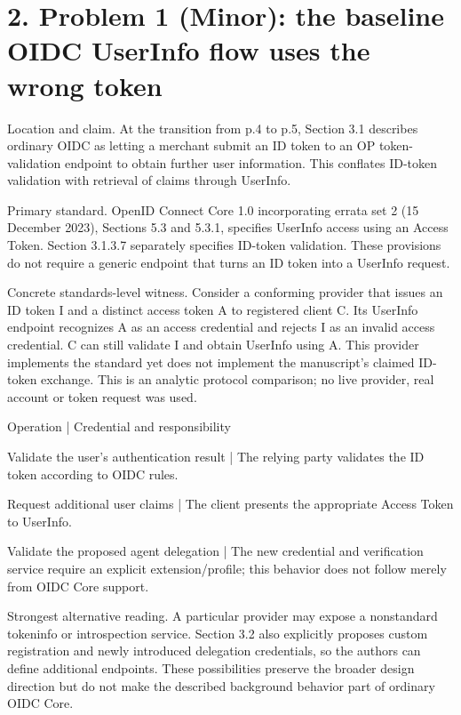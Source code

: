 \documentclass[10pt]{article}
\begin{document}
\section*{2. Problem 1 (Minor): the baseline OIDC UserInfo flow uses the wrong token}
Location and claim. At the transition from p.4 to p.5, Section 3.1 describes ordinary OIDC as letting a merchant submit an ID token to an OP token-validation endpoint to obtain further user information. This conflates ID-token validation with retrieval of claims through UserInfo.\par
Primary standard. OpenID Connect Core 1.0 incorporating errata set 2 (15 December 2023), Sections 5.3 and 5.3.1, specifies UserInfo access using an Access Token. Section 3.1.3.7 separately specifies ID-token validation. These provisions do not require a generic endpoint that turns an ID token into a UserInfo request.\par
Concrete standards-level witness. Consider a conforming provider that issues an ID token I and a distinct access token A to registered client C. Its UserInfo endpoint recognizes A as an access credential and rejects I as an invalid access credential. C can still validate I and obtain UserInfo using A. This provider implements the standard yet does not implement the manuscript’s claimed ID-token exchange. This is an analytic protocol comparison; no live provider, real account or token request was used.\par
Operation | Credential and responsibility\par
Validate the user’s authentication result | The relying party validates the ID token according to OIDC rules.\par
Request additional user claims | The client presents the appropriate Access Token to UserInfo.\par
Validate the proposed agent delegation | The new credential and verification service require an explicit extension/profile; this behavior does not follow merely from OIDC Core support.\par
Strongest alternative reading. A particular provider may expose a nonstandard tokeninfo or introspection service. Section 3.2 also explicitly proposes custom registration and newly introduced delegation credentials, so the authors can define additional endpoints. These possibilities preserve the broader design direction but do not make the described background behavior part of ordinary OIDC Core.\par
\end{document}
